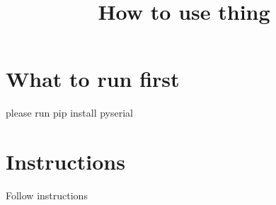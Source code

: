 \documentclass{article}
\title{How to use thing}
\begin{document}
 \chapter{What to run first}
 please run pip install pyserial
 \chapter{Instructions}
 Follow instructions
\end{document}
